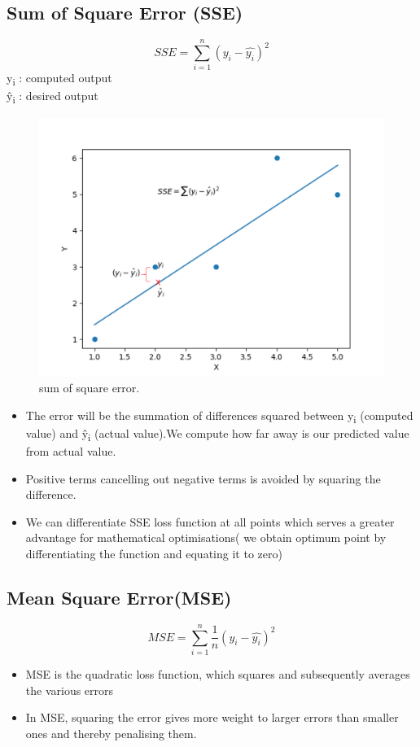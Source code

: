 \documentclass{resources/WeSTassignment}
\begin{document}
\subsection{Sum of Square Error (SSE)}
\[ SSE = \sum_{i=1}^{n} (y_i-\hat{y_i} )^2 \]
y\textsubscript{i} : computed output \\
\^y\textsubscript{i} : desired output
\begin{figure}[htbp]
\centerline{\includegraphics[scale=.5]{./resources/sse.png}}
\caption{sum of square error.}
\label{fig}
\end{figure}
\begin{itemize}
\item The error will be the summation of differences squared between y\textsubscript{i} (computed value) and \^y\textsubscript{i} (actual value).We compute how far away is our predicted value from actual value.
\item Positive terms cancelling out negative terms is avoided by squaring the difference.
\item We can differentiate SSE loss  function at all points which serves a greater advantage for mathematical optimisations( we obtain optimum point by differentiating the function and equating it to zero)
\end{itemize}
\subsection{Mean Square Error(MSE)}
\[ MSE = \sum_{i=1}^{n}\frac{1}{n} (y_i-\hat{y_i} )^2 \]
\begin{itemize}
	\item MSE is the quadratic loss function, which squares and subsequently
averages the various errors
	\item In MSE, squaring the error gives more weight to larger errors than smaller ones and thereby penalising them.
  
\end{itemize}
\end{document}
